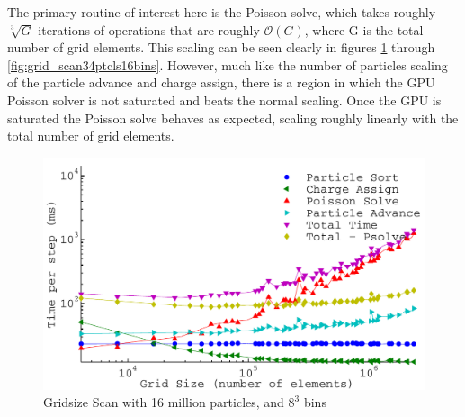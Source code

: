 The primary routine of interest here is the Poisson solve, which takes roughly $\sqrt[3]{G}$ iterations of operations that are roughly $\mathcal{O}(G)$, where G is the total number of grid elements. This scaling can be seen clearly in figures \ref{fig:grid_scan16ptcls8bins} through \ref{fig:grid_scan34ptcls16bins}. However, much like the number of particles scaling of the particle advance and charge assign, there is a region in which the GPU Poisson solver is not saturated and beats the normal scaling. Once the GPU is saturated the Poisson solve behaves as expected, scaling roughly linearly with the total number of grid elements. 





\begin{figure}
\begin{center}
\includegraphics[width=6in]{performance/gridsize_scan16ptcls8bins.pdf}
\end{center}
\caption[Gridsize Scan with 16 million particles and $8^3$ bins]{Gridsize Scan with 16 million particles, and $8^3$ bins}
\label{fig:grid_scan16ptcls8bins}
\end{figure}

